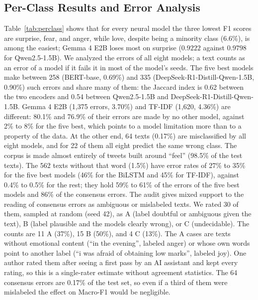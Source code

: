 \subsection{Per-Class Results and Error Analysis}
Table~\ref{tab:perclass} shows that for every neural model the three lowest F1 scores are surprise, fear, and anger, while love, despite being a minority class (6.6\%), is among the easiest; Gemma 4 E2B loses most on surprise ($0.9222$ against $0.9798$ for Qwen2.5-1.5B). We analyzed the errors of all eight models; a text counts as an error of a model if it fails it in most of the model's seeds. The five best models make between 258 (BERT-base, 0.69\%) and 335 (DeepSeek-R1-Distill-Qwen-1.5B, 0.90\%) such errors and share many of them: the Jaccard index is 0.62 between the two encoders and 0.54 between Qwen2.5-1.5B and DeepSeek-R1-Distill-Qwen-1.5B. Gemma 4 E2B (1,375 errors, 3.70\%) and TF-IDF (1,620, 4.36\%) are different: 80.1\% and 76.9\% of their errors are made by no other model, against 2\% to 8\% for the five best, which points to a model limitation more than to a property of the data. At the other end, 64 texts (0.17\%) are misclassified by all eight models, and for 22 of them all eight predict the same wrong class. The corpus is made almost entirely of tweets built around ``feel'' (98.5\% of the test texts). The 562 texts without that word (1.5\%) have error rates of 27\% to 35\% for the five best models (46\% for the BiLSTM and 45\% for TF-IDF), against 0.4\% to 0.5\% for the rest; they hold 59\% to 61\% of the errors of the five best models and 86\% of the consensus errors. The audit gives mixed support to the reading of consensus errors as ambiguous or mislabeled texts. We rated 30 of them, sampled at random (seed 42), as A (label doubtful or ambiguous given the text), B (label plausible and the models clearly wrong), or C (undecidable). The counts are 11 A (37\%), 15 B (50\%), and 4 C (13\%). The A cases are texts without emotional content (``in the evening'', labeled anger) or whose own words point to another label (``i was afraid of obtaining low marks'', labeled joy). One author rated them after seeing a first pass by an AI assistant and kept every rating, so this is a single-rater estimate without agreement statistics. The 64 consensus errors are 0.17\% of the test set, so even if a third of them were mislabeled the effect on Macro-F1 would be negligible.

\begin{table}[t]
\centering
\caption{Per-class F1 on the test set (mean over three seeds).}
\label{tab:perclass}
\small

\end{table}

